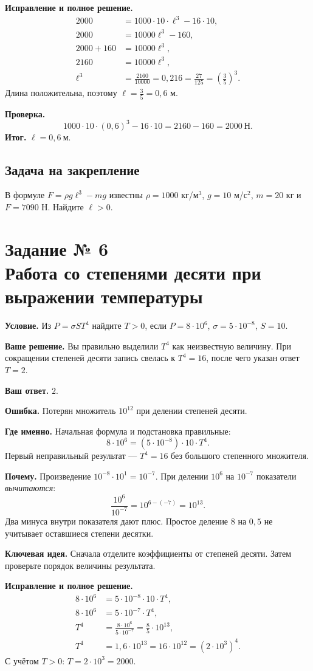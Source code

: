 \documentclass[a4paper,11pt]{article}
\newcommand{\Err}{\textcolor{errorred}{\textbf{Ошибка.}}}
\newcommand{\Key}{\textcolor{darkaccent}{\textbf{Ключевая идея.}}}
\newcommand{\Result}{\textcolor{accent}{\textbf{Итог.}}}
\newcommand{\taskhead}[2]{\phantomsection\label{task:#1}\section*{Задание № #1\\[3pt]\large\normalfont #2}}
\begin{document}
\textbf{Исправление и полное решение.}
\begin{align*}
2000&=1000\cdot10\cdot\ell^3-16\cdot10,\\
2000&=10000\ell^3-160,\\
2000+160&=10000\ell^3,\\
2160&=10000\ell^3,\\
\ell^3&=\frac{2160}{10000}=0{,}216
=\frac{27}{125}=\left(\frac35\right)^3.
\end{align*}
Длина положительна, поэтому $\ell=\frac35=0{,}6$ м.

\textbf{Проверка.}
\[
1000\cdot10\cdot(0{,}6)^3-16\cdot10
=2160-160=2000\ \text{Н}.
\]
\Result{} $\boxed{\ell=0{,}6\ \text{м}}$.

\subsection*{Задача на закрепление}
В формуле $F=\rho g\ell^3-mg$ известны $\rho=1000$ кг/м$^3$, $g=10$ м/с$^2$, $m=20$ кг и $F=7090$ Н. Найдите $\ell>0$.
\newpage
\taskhead{6}{Работа со степенями десяти при выражении температуры}
\textbf{Условие.} Из $P=\sigma S T^4$ найдите $T>0$, если $P=8\cdot10^6$, $\sigma=5\cdot10^{-8}$, $S=10$.

\textbf{Ваше решение.} Вы правильно выделили $T^4$ как неизвестную величину. При сокращении степеней десяти запись свелась к $T^4=16$, после чего указан ответ $T=2$.

\textbf{Ваш ответ.} $2$.

\Err{} Потерян множитель $10^{12}$ при делении степеней десяти.

\textbf{Где именно.} Начальная формула и подстановка правильные:
\[
8\cdot10^6=(5\cdot10^{-8})\cdot10\cdot T^4.
\]
Первый неправильный результат --- $T^4=16$ без большого степенного множителя.

\textbf{Почему.} Произведение $10^{-8}\cdot10^1=10^{-7}$. При делении $10^6$ на $10^{-7}$ показатели \emph{вычитаются}:
\[
\frac{10^6}{10^{-7}}=10^{6-(-7)}=10^{13}.
\]
Два минуса внутри показателя дают плюс. Простое деление $8$ на $0{,}5$ не учитывает оставшиеся степени десятки.

\Key{} Сначала отделите коэффициенты от степеней десяти. Затем проверьте порядок величины результата.

\textbf{Исправление и полное решение.}
\begin{align*}
8\cdot10^6 &= 5\cdot10^{-8}\cdot10\cdot T^4,\\
8\cdot10^6 &= 5\cdot10^{-7}\cdot T^4,\\
T^4 &= \frac{8\cdot10^6}{5\cdot10^{-7}}
=\frac85\cdot10^{13},\\
T^4 &= 1{,}6\cdot10^{13}
=16\cdot10^{12}
=(2\cdot10^3)^4.
\end{align*}
С учётом $T>0$: $T=2\cdot10^3=2000$.
\end{document}
